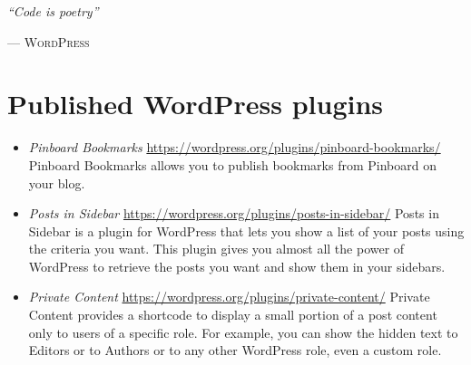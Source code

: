 \begin{flushright}
	\normalsize
	\textit{``Code is poetry''}\medskip

	\scriptsize --- \textsc{WordPress}
\end{flushright}

\vfill

\begingroup

	\small

	\section*{Published WordPress plugins}

	\begin{itemize}
		\item \emph{Pinboard Bookmarks}\newline
		\url{https://wordpress.org/plugins/pinboard-bookmarks/}\newline
		Pinboard Bookmarks allows you to publish bookmarks from Pinboard on your
		blog.
		\item \emph{Posts in Sidebar}\newline
		\url{https://wordpress.org/plugins/posts-in-sidebar/}\newline
		Posts in Sidebar is a plugin for WordPress that lets you show a list of
		your posts using the criteria you want. This plugin gives you almost all
		the power of WordPress to retrieve the posts you want and show them in
		your sidebars.
		\item \emph{Private Content}\newline
		\url{https://wordpress.org/plugins/private-content/}\newline
		Private Content provides a shortcode to display a small portion of a
		post content only to users of a specific role. For example, you can show
		the hidden text to Editors or to Authors or to any other WordPress role,
		even a custom role.
	\end{itemize}

\endgroup
